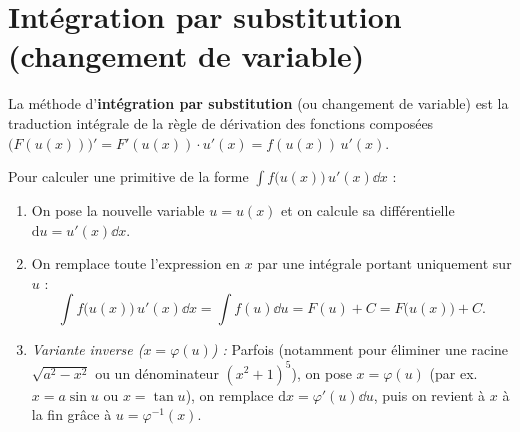 \section{Intégration par substitution (changement de variable)}

La méthode d'\textbf{intégration par substitution} (ou changement de variable) est la traduction intégrale de la règle de dérivation des fonctions composées $\bigl(F(u(x))\bigr)' = F'(u(x))\cdot u'(x) = f(u(x))\,u'(x)$.

\begin{theoreme}
Pour calculer une primitive de la forme $\displaystyle\int f\bigl(u(x)\bigr)\,u'(x)\dd x$ :
\begin{enumerate}
    \item On pose la nouvelle variable $\boxed{u = u(x)}$ et on calcule sa différentielle $\boxed{\mathrm{d}u = u'(x)\dd x}$.
    \item On remplace toute l'expression en $x$ par une intégrale portant uniquement sur $u$ :
    \[
        \boxed{\int f\bigl(u(x)\bigr)\,u'(x)\dd x = \int f(u)\dd u = F(u) + C = F\bigl(u(x)\bigr) + C}.
    \]
    \item \emph{Variante inverse ($x = \varphi(u)$) :} Parfois (notamment pour éliminer une racine $\sqrt{a^2 - x^2}$ ou un dénominateur $(x^2+1)^5$), on pose $x = \varphi(u)$ (par ex. $x = a\sin u$ ou $x = \tan u$), on remplace $\mathrm{d}x = \varphi'(u)\dd u$, puis on revient à $x$ à la fin grâce à $u = \varphi^{-1}(x)$.
\end{enumerate}
\end{theoreme}

